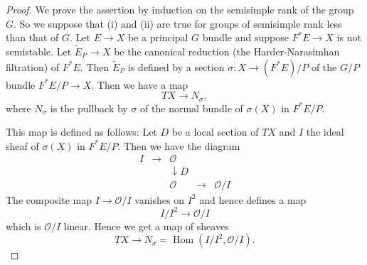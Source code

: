 \documentclass[12pt]{article}
\begin{document}
\begin{proof}
We prove the assertion by induction on the semisimple rank of the group $G$. So we suppose that (i) and (ii) are true for groups of semisimple rank less than that of $G$. Let $E \to X$ be a principal $G$ bundle and suppose $F^*E \to X$ is not semistable. Let $\widetilde{E}_P \to X$ be the canonical reduction (the Harder-Narasimhan filtration) of $F^*E$. Then $\widetilde{E}_P$ is defined by a section $\sigma:X\to (F^*E)/P$ of the $G/P$ bundle $F^*E/P\to X$. Then we have a map
\[
TX \to N_\sigma,
\]
where $N_\sigma$ is the pullback by $\sigma$ of the normal bundle of $\sigma(X)$ in $F^*E/P$.

This map is defined as follows: Let $D$ be a local section of $TX$ and $I$ the ideal sheaf of $\sigma(X)$ in $F^*E/P$. Then we have the diagram
\[
\begin{array}{ccccc}
I & \to & \mathcal{O} & & \\
 & & \downarrow D &&\\
& &\mathcal{O} & \to & \mathcal{O}/I
\end{array}
\]
The composite map $I \to \mathcal{O}/I$ vanishes on $I^2$ and hence defines a map
\[
I/I^2 \to \mathcal{O}/I
\]
which is $\mathcal{O}/I$ linear. Hence we get a map of sheaves
\[
TX \to N_\sigma = \operatorname{Hom}(I/I^2, \mathcal{O}/I).
\]


\end{proof}
\end{document}
